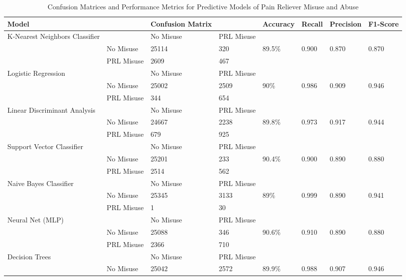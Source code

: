 \documentclass[sigconf]{acmart}
\begin{document}

\begin{table*}[ht]
  \caption{Confusion Matrices and Performance Metrics for Predictive Models of 
  Pain Reliever Misuse and Abuse}
  \label{tab:freq}
  \begin{tabular}{llllllll}
    \toprule
    Model& & Confusion Matrix & & Accuracy & Recall & Precision & F1-Score \\
    \midrule
    K-Nearest Neighbors Classifier & & No Misuse & PRL Misuse &  &  &  & \\
     & No Misuse & 25114 & 320 & 89.5\% & 0.900 & 0.870 & 0.870 \\
     & PRL Misuse & 2609 & 467 &  &  &  & \\
    \midrule
    Logistic Regression & & No Misuse & PRL Misuse &  &  &  & \\
     & No Misuse & 25002 & 2509 & 90\% & 0.986 & 0.909 & 0.946 \\
     & PRL Misuse & 344 & 654 &  &  &  & \\
    \midrule
    Linear Discriminant Analysis  & & No Misuse & PRL Misuse &  &  &  & \\
     & No Misuse & 24667 & 2238 & 89.8\% & 0.973 & 0.917 & 0.944 \\
     & PRL Misuse & 679 & 925 &  &  &  & \\
    \midrule
    Support Vector Classifier  & & No Misuse & PRL Misuse &  &  &  & \\
     & No Misuse & 25201 & 233 & 90.4\% & 0.900 & 0.890 & 0.880 \\
     & PRL Misuse & 2514 & 562 &  &  &  & \\
    \midrule
    Naive Bayes Classifier & & No Misuse & PRL Misuse &  &  &  & \\
     & No Misuse & 25345 & 3133 & 89\% & 0.999 & 0.890 & 0.941 \\
     & PRL Misuse & 1 & 30 &  &  &  & \\
    \midrule
    Neural Net (MLP) & & No Misuse & PRL Misuse &  &  &  & \\
     & No Misuse & 25088 & 346 & 90.6\% & 0.910 & 0.890 & 0.880 \\
     & PRL Misuse & 2366 & 710 &  &  &  & \\
    \midrule
    Decision Trees & & No Misuse & PRL Misuse &  &  &  & \\
     & No Misuse & 25042 & 2572 & 89.9\% & 0.988 & 0.907 & 0.946 \\

\end{tabular}
\end{table*}
\end{document}
